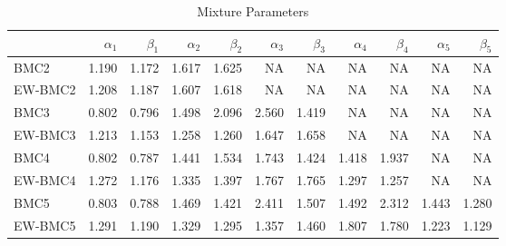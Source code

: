 \documentclass[
]{article}
\begin{document}
\begin{table}[H]

\caption{\label{tab:unnamed-chunk-5}Mixture Parameters}
\centering
\fontsize{8}{10}\selectfont
\begin{tabular}[t]{lrrrrrrrrrr}
\toprule
  & $\alpha_1$ & $\beta_1$ & $\alpha_2$ & $\beta_2$ & $\alpha_3$ & $\beta_3$ & $\alpha_4$ & $\beta_4$ & $\alpha_5$ & $\beta_5$\\
\midrule
BMC2 & 1.190 & 1.172 & 1.617 & 1.625 & NA & NA & NA & NA & NA & NA\\
EW-BMC2 & 1.208 & 1.187 & 1.607 & 1.618 & NA & NA & NA & NA & NA & NA\\
BMC3 & 0.802 & 0.796 & 1.498 & 2.096 & 2.560 & 1.419 & NA & NA & NA & NA\\
EW-BMC3 & 1.213 & 1.153 & 1.258 & 1.260 & 1.647 & 1.658 & NA & NA & NA & NA\\
BMC4 & 0.802 & 0.787 & 1.441 & 1.534 & 1.743 & 1.424 & 1.418 & 1.937 & NA & NA\\
\addlinespace
EW-BMC4 & 1.272 & 1.176 & 1.335 & 1.397 & 1.767 & 1.765 & 1.297 & 1.257 & NA & NA\\
BMC5 & 0.803 & 0.788 & 1.469 & 1.421 & 2.411 & 1.507 & 1.492 & 2.312 & 1.443 & 1.280\\
EW-BMC5 & 1.291 & 1.190 & 1.329 & 1.295 & 1.357 & 1.460 & 1.807 & 1.780 & 1.223 & 1.129\\
\bottomrule
\end{tabular}
\end{table}
\end{document}
